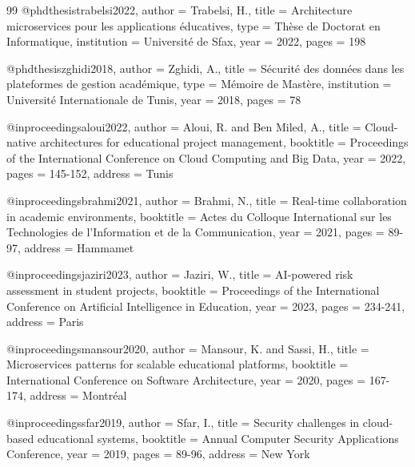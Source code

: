 \begin{thebibliography}{99}
@phdthesis{trabelsi2022,
  author = {Trabelsi, H.},
  title = {Architecture microservices pour les applications éducatives},
  type = {Thèse de Doctorat en Informatique},
  institution = {Université de Sfax},
  year = {2022},
  pages = {198}
}

@phdthesis{zghidi2018,
  author = {Zghidi, A.},
  title = {Sécurité des données dans les plateformes de gestion académique},
  type = {Mémoire de Mastère},
  institution = {Université Internationale de Tunis},
  year = {2018},
  pages = {78}
}

@inproceedings{aloui2022,
  author = {Aloui, R. and Ben Miled, A.},
  title = {Cloud-native architectures for educational project management},
  booktitle = {Proceedings of the International Conference on Cloud Computing and Big Data},
  year = {2022},
  pages = {145-152},
  address = {Tunis}
}

@inproceedings{brahmi2021,
  author = {Brahmi, N.},
  title = {Real-time collaboration in academic environments},
  booktitle = {Actes du Colloque International sur les Technologies de l'Information et de la Communication},
  year = {2021},
  pages = {89-97},
  address = {Hammamet}
}

@inproceedings{jaziri2023,
  author = {Jaziri, W.},
  title = {AI-powered risk assessment in student projects},
  booktitle = {Proceedings of the International Conference on Artificial Intelligence in Education},
  year = {2023},
  pages = {234-241},
  address = {Paris}
}

@inproceedings{mansour2020,
  author = {Mansour, K. and Sassi, H.},
  title = {Microservices patterns for scalable educational platforms},
  booktitle = {International Conference on Software Architecture},
  year = {2020},
  pages = {167-174},
  address = {Montréal}
}

@inproceedings{sfar2019,
  author = {Sfar, I.},
  title = {Security challenges in cloud-based educational systems},
  booktitle = {Annual Computer Security Applications Conference},
  year = {2019},
  pages = {89-96},
  address = {New York}
}

\end{thebibliography}

